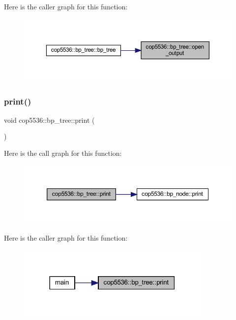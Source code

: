 Here is the caller graph for this function\+:
\nopagebreak
\begin{figure}[H]
\begin{center}
\leavevmode
\includegraphics[width=350pt]{classcop5536_1_1bp__tree_aedfc108a47c4c0fccba58e0fbe4afc85_icgraph}
\end{center}
\end{figure}
\mbox{\label{classcop5536_1_1bp__tree_a5098bb9c72750e80252595a707ad2470}} 
\subsubsection{print()}
{\footnotesize\ttfamily void cop5536\+::bp\+\_\+tree\+::print (\begin{DoxyParamCaption}{ }\end{DoxyParamCaption})}

Here is the call graph for this function\+:
\nopagebreak
\begin{figure}[H]
\begin{center}
\leavevmode
\includegraphics[width=350pt]{classcop5536_1_1bp__tree_a5098bb9c72750e80252595a707ad2470_cgraph}
\end{center}
\end{figure}
Here is the caller graph for this function\+:
\nopagebreak
\begin{figure}[H]
\begin{center}
\leavevmode
\includegraphics[width=270pt]{classcop5536_1_1bp__tree_a5098bb9c72750e80252595a707ad2470_icgraph}
\end{center}
\end{figure}
\mbox{\label{classcop5536_1_1bp__tree_a424febb6a1d7ce333d8713f43d9462a5}} 
